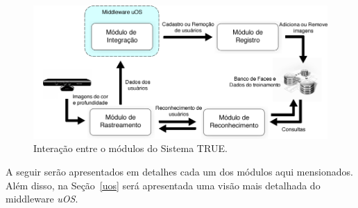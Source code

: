 	\begin{figure}[htb]
			\begin{center}
				\includegraphics[scale=0.5]{figuras/4.ProblemaEProposta/modulo-integracao.png}
			\end{center}
			\caption{Interação entre o módulos do Sistema TRUE.}
			\label{fig:relacao-modulos}
		\end{figure}

A seguir serão apresentados em detalhes cada um dos módulos aqui mensionados. Além disso, na Seção~\ref{uos} será apresentada uma visão mais detalhada do middleware \textit{uOS}.








